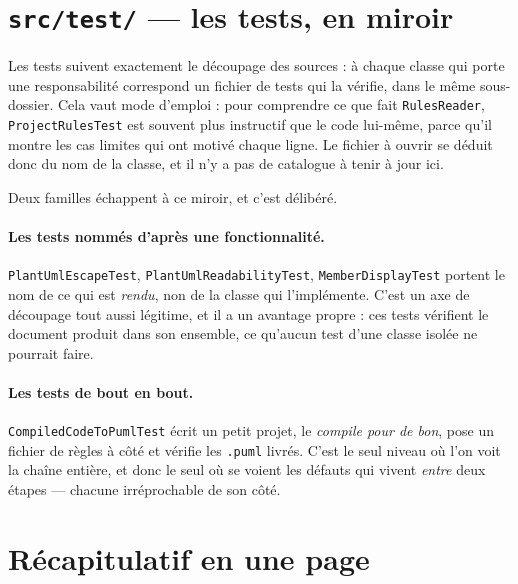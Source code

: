 \documentclass[12pt, a4paper]{article}
\begin{document}
\section{\texttt{src/test/} — les tests, en miroir}

Les tests suivent exactement le découpage des sources : à chaque classe qui porte une
responsabilité correspond un fichier de tests qui la vérifie, dans le même sous-dossier. Cela
vaut mode d'emploi : pour comprendre ce que fait \texttt{RulesReader},
\texttt{ProjectRulesTest} est souvent plus instructif que le code lui-même, parce qu'il montre
les cas limites qui ont motivé chaque ligne. Le fichier à ouvrir se déduit donc du nom de la classe, et il n'y a pas de
catalogue à tenir à jour ici.

Deux familles échappent à ce miroir, et c'est délibéré.

\paragraph{Les tests nommés d'après une fonctionnalité.} \texttt{PlantUmlEscapeTest},
\texttt{PlantUmlReadabilityTest}, \texttt{MemberDisplayTest} portent le nom de ce qui est
\emph{rendu}, non de la classe qui l'implémente. C'est un axe de découpage tout aussi légitime,
et il a un avantage propre : ces tests vérifient le document produit dans son ensemble, ce
qu'aucun test d'une classe isolée ne pourrait faire.

\paragraph{Les tests de bout en bout.} \texttt{CompiledCodeToPumlTest} écrit un petit projet,
le \emph{compile pour de bon}, pose un fichier de règles à côté et vérifie les \texttt{.puml}
livrés. C'est le seul niveau où l'on voit la chaîne entière, et donc le seul où se voient les
défauts qui vivent \emph{entre} deux étapes — chacune irréprochable de son côté.


\section{Récapitulatif en une page}
\end{document}
